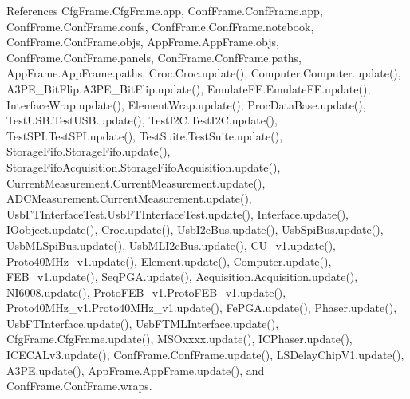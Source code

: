 References Cfg\+Frame.\+Cfg\+Frame.\+app, Conf\+Frame.\+Conf\+Frame.\+app, Conf\+Frame.\+Conf\+Frame.\+confs, Conf\+Frame.\+Conf\+Frame.\+notebook, Conf\+Frame.\+Conf\+Frame.\+objs, App\+Frame.\+App\+Frame.\+objs, Conf\+Frame.\+Conf\+Frame.\+panels, Conf\+Frame.\+Conf\+Frame.\+paths, App\+Frame.\+App\+Frame.\+paths, Croc.\+Croc.\+update(), Computer.\+Computer.\+update(), A3\+P\+E\+\_\+\+Bit\+Flip.\+A3\+P\+E\+\_\+\+Bit\+Flip.\+update(), Emulate\+F\+E.\+Emulate\+F\+E.\+update(), Interface\+Wrap.\+update(), Element\+Wrap.\+update(), Proc\+Data\+Base.\+update(), Test\+U\+S\+B.\+Test\+U\+S\+B.\+update(), Test\+I2\+C.\+Test\+I2\+C.\+update(), Test\+S\+P\+I.\+Test\+S\+P\+I.\+update(), Test\+Suite.\+Test\+Suite.\+update(), Storage\+Fifo.\+Storage\+Fifo.\+update(), Storage\+Fifo\+Acquisition.\+Storage\+Fifo\+Acquisition.\+update(), Current\+Measurement.\+Current\+Measurement.\+update(), A\+D\+C\+Measurement.\+Current\+Measurement.\+update(), Usb\+F\+T\+Interface\+Test.\+Usb\+F\+T\+Interface\+Test.\+update(), Interface.\+update(), I\+Oobject.\+update(), Croc.\+update(), Usb\+I2c\+Bus.\+update(), Usb\+Spi\+Bus.\+update(), Usb\+M\+L\+Spi\+Bus.\+update(), Usb\+M\+L\+I2c\+Bus.\+update(), C\+U\+\_\+v1.\+update(), Proto40\+M\+Hz\+\_\+v1.\+update(), Element.\+update(), Computer.\+update(), F\+E\+B\+\_\+v1.\+update(), Seq\+P\+G\+A.\+update(), Acquisition.\+Acquisition.\+update(), N\+I6008.\+update(), Proto\+F\+E\+B\+\_\+v1.\+Proto\+F\+E\+B\+\_\+v1.\+update(), Proto40\+M\+Hz\+\_\+v1.\+Proto40\+M\+Hz\+\_\+v1.\+update(), Fe\+P\+G\+A.\+update(), Phaser.\+update(), Usb\+F\+T\+Interface.\+update(), Usb\+F\+T\+M\+L\+Interface.\+update(), Cfg\+Frame.\+Cfg\+Frame.\+update(), M\+S\+Oxxxx.\+update(), I\+C\+Phaser.\+update(), I\+C\+E\+C\+A\+Lv3.\+update(), Conf\+Frame.\+Conf\+Frame.\+update(), L\+S\+Delay\+Chip\+V1.\+update(), A3\+P\+E.\+update(), App\+Frame.\+App\+Frame.\+update(), and Conf\+Frame.\+Conf\+Frame.\+wraps.


